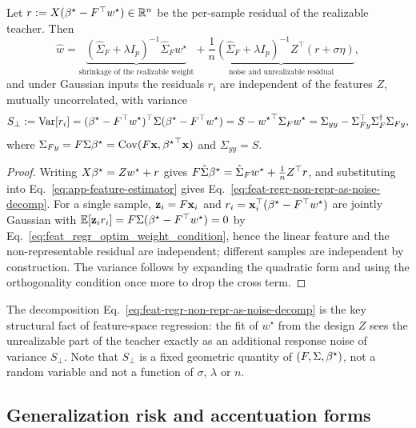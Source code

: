 \begin{lem}
\label{lem:app-residual-as-noise}
Let $r:=X({\beta^{\star}}-F^\top w^\star)\in\mathbb{R}^n$ be the per-sample residual of the
realizable teacher.  Then
\begin{equation}
\hat w=\underbrace{(\hat\Sigma_F+\lambda I_p)^{-1}\hat\Sigma_F w^\star}_{\text{shrinkage of the realizable weight}}
+\underbrace{\frac1n(\hat\Sigma_F+\lambda I_p)^{-1}Z^\top(r+\sigma\eta)}_{\text{noise and unrealizable residual}},
\label{eq:feat-regr-non-repr-as-noise-decomp}
\end{equation}
and under Gaussian inputs the residuals $r_i$ are independent of the
features $Z$, mutually uncorrelated, with variance
\begin{equation}
S_\perp:=\mathrm{Var}[r_i]=({\beta^{\star}}-F^\top w^\star)^\top\Sigma({\beta^{\star}}-F^\top w^\star)
=S-{w^\star}^\top \Sigma_F w^\star
=\Sigma_{yy}-\Sigma_{Fy}^\top \Sigma_F^\dagger\Sigma_{Fy},
\label{eq:non_reducible_var_def}
\end{equation}
where $\Sigma_{Fy}=F\Sigma{\beta^{\star}}=\mathrm{Cov}(F\mathbf{x},{{\beta^{\star}}}^\top\mathbf{x})$ and
$\Sigma_{yy}=S$.
\end{lem}
\begin{proof}
Writing $X{\beta^{\star}}=Zw^\star+r$ gives $F\hat\Sigma{\beta^{\star}}=\hat\Sigma_F w^\star+\frac1nZ^\top r$,
and substituting into Eq.~\ref{eq:app-feature-estimator} gives
Eq.~\ref{eq:feat-regr-non-repr-as-noise-decomp}.  For a single sample,
$\mathbf z_i=F\mathbf{x}_i$ and $r_i=\mathbf{x}_i^\top({\beta^{\star}}-F^\top w^\star)$ are jointly
Gaussian with $\mathbb{E}[\mathbf z_ir_i]=F\Sigma({\beta^{\star}}-F^\top w^\star)=0$ by
Eq.~\ref{eq:feat_regr_optim_weight_condition}, hence the linear feature and the non-representable residual are independent; different
samples are independent by construction.  
The variance follows by expanding the quadratic form and using the orthogonality condition once more to drop the cross term.
\end{proof}

The decomposition Eq.~\ref{eq:feat-regr-non-repr-as-noise-decomp} is the
key structural fact of feature-space regression: the fit of $w^\star$ from
the design $Z$ sees the unrealizable part of the teacher exactly as an
additional response noise of variance $S_\perp$.  Note that $S_\perp$ is a
fixed geometric quantity of $(F,\Sigma,{\beta^{\star}})$, not a random variable and
not a function of $\sigma$, $\lambda$ or $n$.

\subsection{Generalization risk and accentuation forms}

